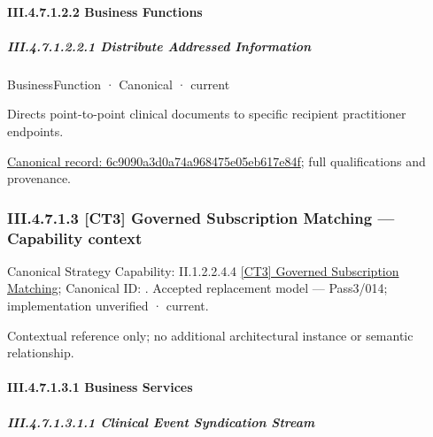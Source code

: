 \paragraph*{III.4.7.1.2.2 Business Functions}
\label{navigation:III.4.7.1.2.2}

\subparagraph*{III.4.7.1.2.2.1 Distribute Addressed Information}
\label{navigation:III.4.7.1.2.2.1}

\label{element:6c9090a3d0a74a968475e05eb617e84f}
{\small BusinessFunction · Canonical · current}\par

Directs point-to-point clinical documents to specific recipient practitioner endpoints.


{\footnotesize \href{../../../../../../../../continuum/business/business-function/6c9090a3d0a74a968475e05eb617e84f.md}{Canonical record: 6c9090a3d0a74a968475e05eb617e84f}; full qualifications and provenance.}\par
\subsubsection*{III.4.7.1.3 [CT3] Governed Subscription Matching — Capability context}
\label{navigation:III.4.7.1.3}

{\small Canonical Strategy Capability: II.1.2.2.4.4 \hyperref[element:0f79a2e62740435b9bef0f662838ab16]{[CT3] Governed Subscription Matching}; Canonical ID: \texttt{}. Accepted replacement model — Pass3/014; implementation unverified · current.}\par
Contextual reference only; no additional architectural instance or semantic relationship.\par
\paragraph*{III.4.7.1.3.1 Business Services}
\label{navigation:III.4.7.1.3.1}

\subparagraph*{III.4.7.1.3.1.1 Clinical Event Syndication Stream}
\label{navigation:III.4.7.1.3.1.1}

